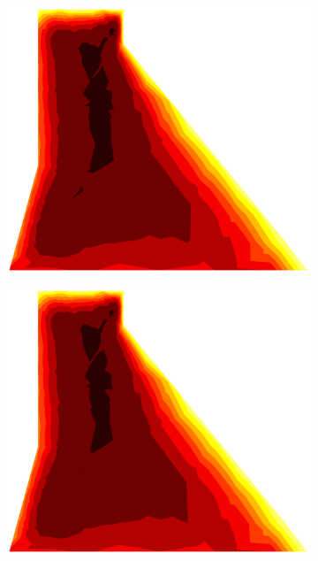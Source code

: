 \documentclass[10pt, a4paper]{article}
\begin{document}
\begin{figure}[H]
\begin{subfigure}[H]{0.19\textwidth}
		\includegraphics[width=1.2\textwidth]{fig/32.eps}
	\end{subfigure}
	\begin{subfigure}[H]{0.19\textwidth}
		\includegraphics[width=1.2\textwidth]{fig/33.eps}
	\end{subfigure}
	\begin{subfigure}[H]{0.19\textwidth}

\end{subfigure}
\end{figure}
\end{document}
